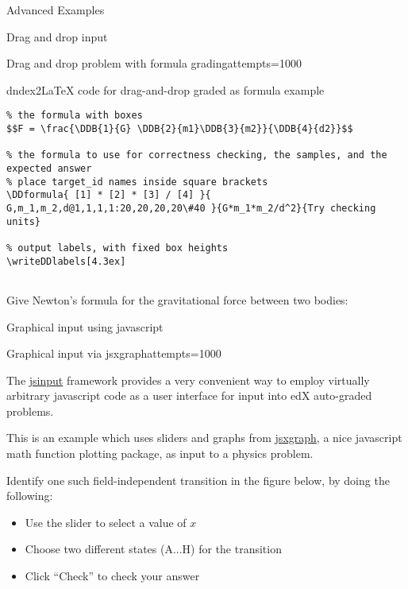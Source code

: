 \begin{edXchapter}{Advanced Examples}
\begin{edXsection}{Drag and drop input}
\begin{edXvertical}
\begin{edXproblem}{Drag and drop problem with formula grading}{attempts=1000}
\begin{edXshowhide}{dndex2}{LaTeX code for drag-and-drop graded as formula example}
\begin{verbatim}
% the formula with boxes
$$F = \frac{\DDB{1}{G} \DDB{2}{m1}\DDB{3}{m2}}{\DDB{4}{d2}}$$

% the formula to use for correctness checking, the samples, and the expected answer
% place target_id names inside square brackets
\DDformula{ [1] * [2] * [3] / [4] }{ G,m_1,m_2,d@1,1,1,1:20,20,20,20\#40 }{G*m_1*m_2/d^2}{Try checking units}

% output labels, with fixed box heights
\writeDDlabels[4.3ex]


\end{verbatim}
\end{edXshowhide}

Give Newton's formula for the gravitational force between two bodies:


\end{edXproblem}


\end{edXvertical}

\end{edXsection}


\begin{edXsection}{Graphical input using javascript}

\begin{edXvertical}

\begin{edXproblem}{Graphical input via jsxgraph}{attempts=1000}

The \href{http://edx.readthedocs.org/projects/devdata/en/latest/course_data_formats/jsinput.html}{jsinput} framework provides a very convenient way to
employ virtually arbitrary javascript code as a user interface for
input into edX auto-graded problems.  

This is an example which uses sliders and graphs from
\href{http://jsxgraph.uni-bayreuth.de/}{jsxgraph}, a nice javascript
math function plotting package, as input to a physics problem.

     Identify one such field-independent transition in the figure
     below, by doing the following:
     \begin{itemize}
     \item Use the slider to select a value of $x$
     \item Choose two different states (A...H) for the transition
     \item Click ``Check'' to check your answer
     \end{itemize}


\end{edXproblem}
\end{edXvertical}
\end{edXsection}
\end{edXchapter}
